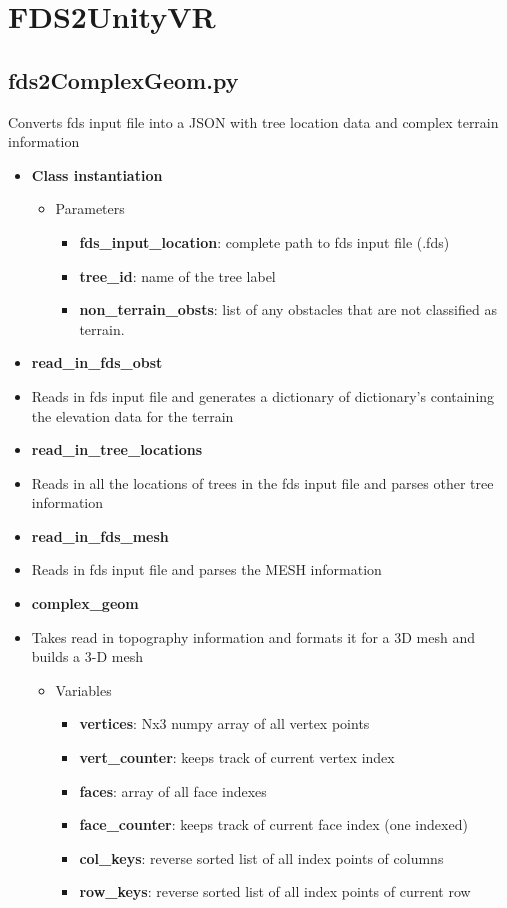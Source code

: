 \section{FDS2UnityVR}
\subsection{fds2ComplexGeom.py}
Converts fds input file into a JSON with tree location data and complex terrain information
\label{PythonComplexGeom}
\begin{itemize}
    \item \textbf{Class instantiation}
    \begin{itemize}    
    \item Parameters   
        \begin{itemize}
        \item\textbf{fds\_input\_location}: complete path to fds input file (.fds)
        \item \textbf{tree\_id}: name of the tree label
        \item \textbf{non\_terrain\_obsts}: list of any obstacles that are not classified as terrain.
        \end{itemize} 
    \end{itemize}
    
    \item \textbf{read\_in\_fds\_obst}
    \item[] Reads in fds input file and generates a dictionary of dictionary's containing the elevation data for the terrain
    
    \item \textbf{read\_in\_tree\_locations}
    \item[] Reads in all the locations of trees in the fds input file and parses other tree information
      
    \item \textbf{read\_in\_fds\_mesh}
    \item[]  Reads in fds input file and parses the MESH information
    
    \item \textbf{complex\_geom}
    \item[] Takes read in topography information and formats it for a 3D mesh and builds a 3-D mesh

    \begin{itemize}    
    \item Variables   
        \begin{itemize}
        \item\textbf{vertices}: Nx3 numpy array of all vertex points
        \item \textbf{vert\_counter}: keeps track of current vertex index
        \item \textbf{faces}: array of all face indexes
        \item \textbf{face\_counter}: keeps track of current face index (one indexed)
        \item \textbf{col\_keys}: reverse sorted list of all index points of columns
        \item \textbf{row\_keys}: reverse sorted list of all index points of current row
        

\end{itemize}
\end{itemize}
\end{itemize}
